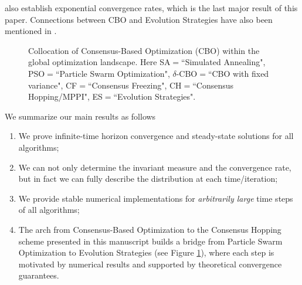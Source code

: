 \documentclass[reqno]{amsart}
\numberwithin{algorithm}{section}
\begin{document}
{also establish exponential convergence rates, which is the last major result of this paper.
Connections between CBO and Evolution Strategies have also been mentioned in \cite{roith25}.
\begin{figure} 
\centering
{}

\caption{Collocation of Consensus-Based Optimization (CBO) within the global optimization landscape. Here SA$=$``Simulated Annealing", PSO$=$``Particle Swarm Optimization", $\delta$-CBO$=$``CBO with fixed variance",  
CF$=$``Consensus Freezing", CH$=$``Consensus Hopping/MPPI", ES$=$``Evolution Strategies".}
\label{fig:CBOworld}
\end{figure}  

We summarize our main results as follows
\begin{enumerate}
    \item We prove infinite-time horizon convergence and steady-state solutions for all algorithms;
    \item We can not only determine the invariant measure and the convergence rate, but in fact we can fully describe the distribution at each time/iteration;
    \item We provide stable numerical implementations for {\it arbitrarily large} time steps of all algorithms;
    \item The arch from Consensus-Based Optimization to the Consensus Hopping scheme presented in this manuscript builds a bridge from Particle Swarm Optimization to Evolution Strategies (see Figure \ref{fig:CBOworld}), where each step is motivated by numerical results and supported by theoretical convergence guarantees.
\end{enumerate}

}
\end{document}
